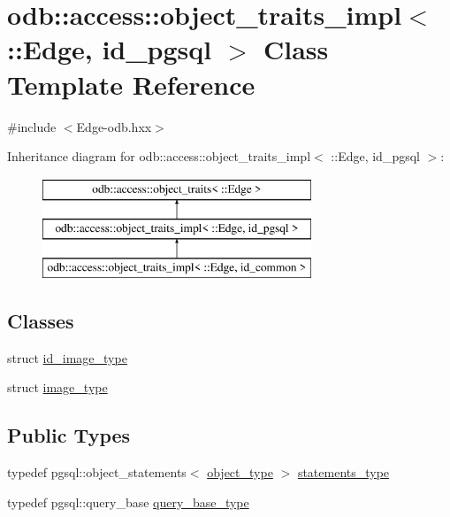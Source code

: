 \hypertarget{classodb_1_1access_1_1object__traits__impl_3_01_1_1_edge_00_01id__pgsql_01_4}{}\section{odb\+:\+:access\+:\+:object\+\_\+traits\+\_\+impl$<$ \+:\+:Edge, id\+\_\+pgsql $>$ Class Template Reference}
\label{classodb_1_1access_1_1object__traits__impl_3_01_1_1_edge_00_01id__pgsql_01_4}


{\ttfamily \#include $<$Edge-\/odb.\+hxx$>$}

Inheritance diagram for odb\+:\+:access\+:\+:object\+\_\+traits\+\_\+impl$<$ \+:\+:Edge, id\+\_\+pgsql $>$\+:\begin{figure}[H]
\begin{center}
\leavevmode
\includegraphics[height=3.000000cm]{d3/d3d/classodb_1_1access_1_1object__traits__impl_3_01_1_1_edge_00_01id__pgsql_01_4}
\end{center}
\end{figure}
\subsection*{Classes}
\begin{DoxyCompactItemize}
\item 
struct \hyperlink{structodb_1_1access_1_1object__traits__impl_3_01_1_1_edge_00_01id__pgsql_01_4_1_1id__image__type}{id\+\_\+image\+\_\+type}
\item 
struct \hyperlink{structodb_1_1access_1_1object__traits__impl_3_01_1_1_edge_00_01id__pgsql_01_4_1_1image__type}{image\+\_\+type}
\end{DoxyCompactItemize}
\subsection*{Public Types}
\begin{DoxyCompactItemize}
\item 
typedef pgsql\+::object\+\_\+statements$<$ \hyperlink{classodb_1_1access_1_1object__traits_3_01_1_1_edge_01_4_aa59b45e2ea5605bb105c5a3e10b06f6a}{object\+\_\+type} $>$ \hyperlink{classodb_1_1access_1_1object__traits__impl_3_01_1_1_edge_00_01id__pgsql_01_4_ae542f808c89b666d052c8a7193b34b66}{statements\+\_\+type}
\item 
typedef pgsql\+::query\+\_\+base \hyperlink{classodb_1_1access_1_1object__traits__impl_3_01_1_1_edge_00_01id__pgsql_01_4_a413670f4b9097cf3e8e84046f9523b53}{query\+\_\+base\+\_\+type}
\end{DoxyCompactItemize}
